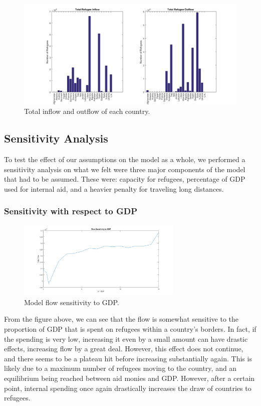 \documentclass{article}
\begin{document}
\begin{figure}[H]
    \centering
    \includegraphics[width=\textwidth]{Sensitivity2/base.png}
    \caption [width=0.9\textwidth]{\centering Total inflow and outflow of each country.}
\end{figure}

\subsection{Sensitivity Analysis}

To test the effect of our assumptions on the model as a whole, we performed a sensitivity analysis on what we felt were three major components of the model that had to be assumed. These were: capacity for refugees, percentage of GDP used for internal aid, and a heavier penalty for traveling long distances.

\subsubsection{Sensitivity with respect to GDP}


\begin{figure}[H]
    \centering
    \includegraphics[width=0.7\textwidth]{Sensitivity3/sgdp.png}
    \caption [width=0.5\textwidth]{\centering Model flow sensitivity to GDP.}
\end{figure}

From the figure above, we can see that the flow is somewhat sensitive to the proportion of GDP that is spent on refugees within a country's borders. In fact, if the spending is very low, increasing it even by a small amount can have drastic effects, increasing flow by a great deal. However, this effect does not continue, and there seems to be a plateau hit before increasing substantially again. This is likely due to a maximum number of refugees moving to the country, and an equilibrium being reached between aid monies and GDP. However, after a certain point, internal spending once again drastically increases the draw of countries to refugees.
\end{document}
